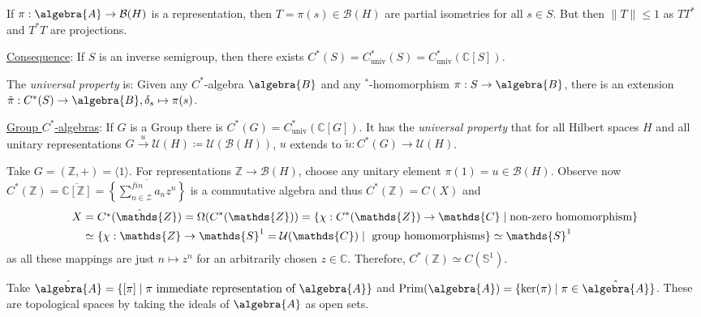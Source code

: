 \documentclass[a4paper]{article}
\begin{document}
\begin{example}
	If $\pi: \algebra{A} \to \mathcal{B}(H)$ is a representation, then $T = \pi(s) \in \mathcal{B}(H)$ are partial isometries for all $s \in S$.
	But then $\|T\| \leq 1$ as $TT^*$ and $T^*T$ are projections.

	\underline{Consequence}: If $S$ is an inverse semigroup, then there exists $C^*(S) = C^*_\mathrm{univ}(S) = C^*_\mathrm{univ}(\mathds{C}[S])$.

	The \textit{universal property} is: Given any $C^*$-algebra $\algebra{B}$ and any $^*$-homomorphism $\pi: S \to \algebra{B}$, there is an extension $\tilde{\pi}: C^*(S) \to \algebra{B}, \delta_s \mapsto \pi(s)$.

	\underline{Group $C^*$-algebras}: If $G$ is a Group there is $C^*(G) = C^*_\mathrm{univ}(\mathds{C}[G])$.
	It has the \textit{universal property} that for all Hilbert spaces $H$ and all unitary representations $G \xrightarrow{u} \mathcal{U}(H) \coloneq \mathcal{U}(\mathcal{B}(H))$, $u$ extends to $\tilde{u}: C^*(G) \to \mathcal{U}(H)$.
\end{example}

\begin{example}
	Take $G = (\mathds{Z}, +) = \langle 1 \rangle$.
	For representations $\mathds{Z} \to \mathcal{B}(H)$, choose any unitary element $\pi(1) = u \in \mathcal{B}(H)$.
	Observe now $C^*(\mathds{Z}) = \overline{\mathds{C}[\mathds{Z}]} = \overline{\left\{ \sum_{n \in \mathscr{Z}}^{fin} a_n z^n \right\}}$ is a commutative algebra and thus $C^*(\mathds{Z}) = C(X)$ and 
	\begin{align*}
		X &= \Hat{C^*(\mathds{Z})} = \Omega(C^*(\mathds{Z})) = \{ \chi: C^*(\mathds{Z}) \to \mathds{C} \mid \text{non-zero homomorphism} \}\\
		&\simeq \{ \chi: \mathds{Z} \to \mathds{S}^1 = \mathcal{U}(\mathds{C}) \mid \text{ group homomorphisms} \} \simeq \mathds{S}^1
	\end{align*}
	as all these mappings are just $n \mapsto z^n$ for an arbitrarily chosen $z \in\mathds{C}$.
	Therefore, $C^*(\mathds{Z}) \simeq C(\mathds{S}^1)$.

	
\end{example}


Take $\hat{\algebra{A}} = \{ [\pi] \mid \pi \text{ immediate representation of } \algebra{A} \}$ and $\mathrm{Prim}(\algebra{A}) = \{ \ker(\pi) \mid \pi \in \hat{\algebra{A}} \}$.
These are topological spaces by taking the ideals of $\algebra{A}$ as open sets.
\end{document}
